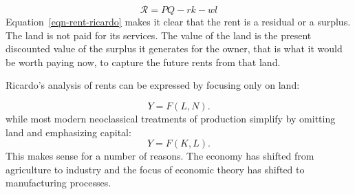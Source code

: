 \begin{equation} 
\mathcal{R}= PQ-rk-wl
\label{eqn-rent-ricardo}
\end{equation} 
Equation~\ref{eqn-rent-ricardo} makes it clear that the rent is a residual or a \gls{surplus}. The land is not paid for its services. The value of the land is the \gls{present discounted value} of the surplus it generates for the owner, that is what it would be worth paying now, to capture the future rents from that land.

Ricardo's analysis of rents  can be expressed by focusing only on land:

\begin{equation} 
Y=F(L,N).
\label{eqn-production-ricardo-2}
\end{equation} 
while most modern neoclassical treatments of production simplify by omitting land and emphasizing capital:\begin{equation} 
Y=F(K,L).
\label{eqn-production}
\end{equation}  
This makes sense for a number of reasons. The economy has shifted from agriculture to industry and the focus of economic theory has shifted to manufacturing processes.



